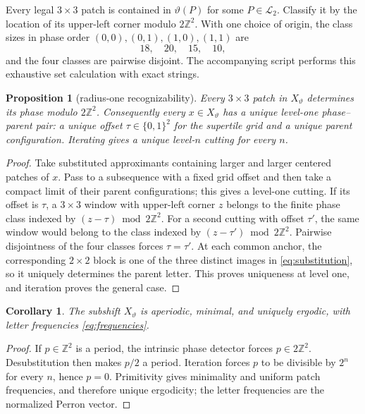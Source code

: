 \documentclass[11pt,a4paper]{amsart}
\newtheorem{proposition}[theorem]{Proposition}
\newtheorem{corollary}[theorem]{Corollary}
\theoremstyle{definition}
\theoremstyle{remark}
\newcommand{\Z}{\mathbb Z}
\newcommand{\cL}{\mathcal L}
\begin{document}
Every legal $3\times3$ patch is contained in $\vartheta(P)$ for some
$P\in\cL_2$.  Classify it by the location of its upper-left corner modulo
$2\Z^2$.  With one choice of origin, the class sizes in phase order
$(0,0),(0,1),(1,0),(1,1)$ are
\begin{equation}\label{eq:phase-counts}
 18,\quad20,\quad15,\quad10,
\end{equation}
and the four classes are pairwise disjoint.  The accompanying script performs
this exhaustive set calculation with exact strings.

\begin{proposition}[radius-one recognizability]\label{prop:recognizable}
Every $3\times3$ patch in $X_\vartheta$ determines its phase modulo $2\Z^2$.
Consequently every $x\in X_\vartheta$ has a unique level-one phase--parent
pair: a unique offset $\tau\in\{0,1\}^2$ for the supertile grid and a unique
parent configuration.  Iterating gives a unique level-$n$ cutting for every
$n$.
\end{proposition}

\begin{proof}
Take substituted approximants containing larger and larger centered patches
of $x$.  Pass to a subsequence with a fixed grid offset and then take a
compact limit of their parent configurations; this gives a level-one cutting.
If its offset is $\tau$, a $3\times3$ window with upper-left corner $z$
belongs to the finite phase class indexed by
$(z-\tau)\bmod2\Z^2$.  For a second cutting with offset $\tau'$, the same
window would belong to the class indexed by
$(z-\tau')\bmod2\Z^2$.  Pairwise disjointness of the four classes forces
$\tau=\tau'$.  At each common anchor, the corresponding $2\times2$ block is
one of the three distinct images in \eqref{eq:substitution}, so it uniquely
determines the parent letter.  This proves uniqueness at level one, and
iteration proves the general case.
\end{proof}

\begin{corollary}\label{cor:aperiodic}
The subshift $X_\vartheta$ is aperiodic, minimal, and uniquely ergodic, with
letter frequencies \eqref{eq:frequencies}.
\end{corollary}

\begin{proof}
If $p\in\Z^2$ is a period, the intrinsic phase detector forces
$p\in2\Z^2$.  Desubstitution then makes $p/2$ a period.  Iteration forces $p$
to be divisible by $2^n$ for every $n$, hence $p=0$.  Primitivity gives
minimality and uniform patch frequencies, and therefore unique ergodicity;
the letter frequencies are the normalized Perron vector.
\end{proof}
\end{document}
